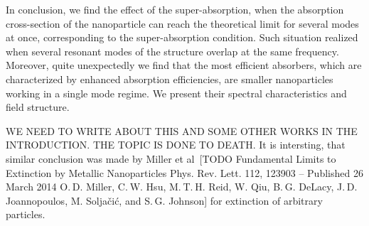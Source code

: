 \documentclass[aps,prl,twocolumn,showpacs,superscriptaddress,groupedaddress]{revtex4-1}
\begin{document}
In conclusion, we find the effect of the super-absorption, when the
absorption cross-section of the nanoparticle can reach the theoretical
limit for several modes at once, corresponding to the super-absorption
condition. Such situation realized when several resonant modes of the
structure overlap at the same frequency. Moreover, quite unexpectedly
we find that the most efficient absorbers, which are characterized by
enhanced absorption efficiencies, are smaller nanoparticles working in
a single mode regime. We present their spectral characteristics and
field structure.


WE NEED TO WRITE ABOUT THIS AND SOME OTHER WORKS IN THE
INTRODUCTION. THE TOPIC IS DONE TO DEATH. It is intersting, that
similar conclusion was made by Miller et al~[TODO Fundamental Limits
to Extinction by Metallic Nanoparticles Phys. Rev. Lett. 112, 123903 –
Published 26 March 2014 O. D. Miller, C. W. Hsu, M. T. H. Reid,
W. Qiu, B. G. DeLacy, J. D. Joannopoulos, M. Soljačić, and
S. G. Johnson] for extinction of arbitrary particles.



\end{document}
